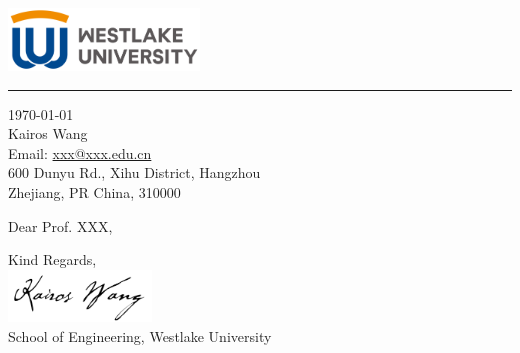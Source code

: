 \documentclass[12pt]{letter}
\makeatletter
\newcommand{\sender}{Kairos Wang} %
\newcommand{\recipient}{Prof. XXX} %
\newcommand{\university}{Westlake University} %
\newcommand{\street}{600 Dunyu Rd., Xihu District, Hangzhou} %
\newcommand{\city}{Zhejiang} %
\newcommand{\country}{PR China} %
\newcommand{\zip}{310000} %
\newcommand{\email}{xxx@xxx.edu.cn} %
\makeatother
\begin{document}
\begin{flushleft}
    \vspace{0.1in}
    \includegraphics[width=2in]{figures/logo.png}
    \vspace{0.1in}
\end{flushleft}
\vspace{-0.3in}
\rule{\linewidth}{1.5pt} %


\begin{flushright}
\today \\
\vspace{0.1in}
\sender \\
Email: \href{mailto:\email}{\email} \\
\street \\
\city, \country, \zip \\
\end{flushright}


\begin{flushleft}
Dear \recipient,
\end{flushleft}

{\setlength{\parindent}{20pt}
}


\vfill
\begin{flushleft}
Kind Regards, \\
\vspace{0.1in}
\includegraphics[width=1.5in]{figures/sign.png} \\
\vspace{0.1in}
School of Engineering, \university \\
\end{flushleft}
\end{document}
